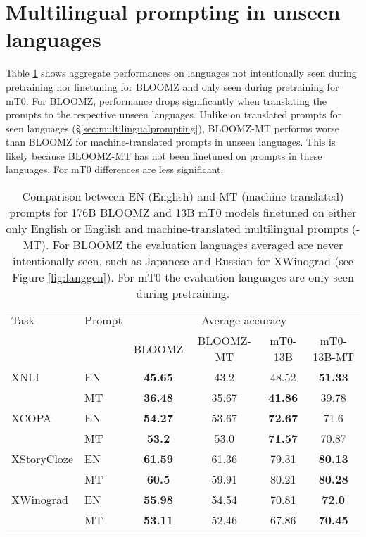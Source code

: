 \documentclass[11pt]{article}
\begin{document}
\section{Multilingual prompting in unseen languages}
\label{sec:multiunseen}

Table \ref{tab:promptlangl2} shows aggregate performances on languages not intentionally seen during pretraining nor finetuning for BLOOMZ and only seen during pretraining for mT0. For BLOOMZ, performance drops significantly when translating the prompts to the respective unseen languages. Unlike on translated prompts for seen languages (\S\ref{sec:multilingualprompting}), BLOOMZ-MT performs worse than BLOOMZ for machine-translated prompts in unseen languages. This is likely because BLOOMZ-MT has not been finetuned on prompts in these languages. For mT0 differences are less significant.

\begin{table}[htbp]
    \small
    \begin{center}
            \begin{tabular}{ll|cc|cc}
\toprule
Task & Prompt & \multicolumn{4}{c}{Average accuracy} \\
     &        & BLOOMZ & BLOOMZ-MT & mT0-13B & mT0-13B-MT \\
\midrule
XNLI & EN & \textbf{45.65} & 43.2 & 48.52 & \textbf{51.33} \\
 & MT & \textbf{36.48} & 35.67 & \textbf{41.86} & 39.78 \\
\midrule
XCOPA & EN & \textbf{54.27} & 53.67 & \textbf{72.67} & 71.6 \\
 & MT & \textbf{53.2} & 53.0 & \textbf{71.57} & 70.87\\
\midrule
XStoryCloze & EN & \textbf{61.59} & 61.36 & 79.31 & \textbf{80.13} \\
 & MT & \textbf{60.5} & 59.91 & 80.21 & \textbf{80.28}\\
\midrule
XWinograd & EN & \textbf{55.98} & 54.54 & 70.81 & \textbf{72.0} \\
 & MT & \textbf{53.11} & 52.46 & 67.86 & \textbf{70.45} \\
\bottomrule
            \end{tabular}
    \caption{Comparison between EN (English) and MT (machine-translated) prompts for 176B BLOOMZ and 13B mT0 models finetuned on either only English or English and machine-translated multilingual prompts (-MT). For BLOOMZ the evaluation languages averaged are never intentionally seen, such as Japanese and Russian for XWinograd (see Figure \ref{fig:langgen}). For mT0 the evaluation languages are only seen during pretraining.}
    \label{tab:promptlangl2}
    \end{center}
\end{table}
\end{document}
